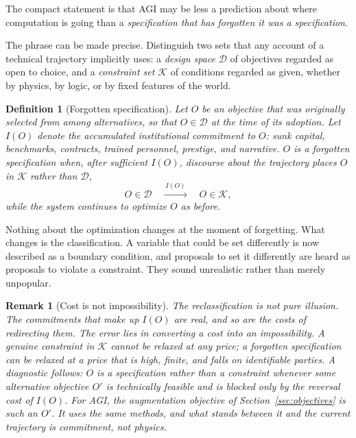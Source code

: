 \documentclass[11pt]{article}
\newtheorem{definition}{Definition}
\newtheorem{remark}{Remark}
\begin{document}
The compact statement is that AGI may be less a prediction about where computation is going than a \emph{specification that has forgotten it was a specification}.

The phrase can be made precise. Distinguish two sets that any account of a technical trajectory implicitly uses: a \emph{design space} $\mathcal{D}$ of objectives regarded as open to choice, and a \emph{constraint set} $\mathcal{K}$ of conditions regarded as given, whether by physics, by logic, or by fixed features of the world.

\begin{definition}[Forgotten specification]
Let $O$ be an objective that was originally selected from among alternatives, so that $O \in \mathcal{D}$ at the time of its adoption. Let $I(O)$ denote the accumulated institutional commitment to $O$: sunk capital, benchmarks, contracts, trained personnel, prestige, and narrative. $O$ is a \emph{forgotten specification} when, after sufficient $I(O)$, discourse about the trajectory places $O$ in $\mathcal{K}$ rather than $\mathcal{D}$,
\[
O \in \mathcal{D}
\quad\xrightarrow{\ I(O)\ }\quad
O \in \mathcal{K},
\]
while the system continues to optimize $O$ as before.
\end{definition}

Nothing about the optimization changes at the moment of forgetting. What changes is the classification. A variable that could be set differently is now described as a boundary condition, and proposals to set it differently are heard as proposals to violate a constraint. They sound unrealistic rather than merely unpopular.

\begin{remark}[Cost is not impossibility]
The reclassification is not pure illusion. The commitments that make up $I(O)$ are real, and so are the costs of redirecting them. The error lies in converting a cost into an impossibility. A genuine constraint in $\mathcal{K}$ cannot be relaxed at any price; a forgotten specification can be relaxed at a price that is high, finite, and falls on identifiable parties. A diagnostic follows: $O$ is a specification rather than a constraint whenever some alternative objective $O'$ is technically feasible and is blocked only by the reversal cost of $I(O)$. For AGI, the augmentation objective of Section~\ref{sec:objectives} is such an $O'$. It uses the same methods, and what stands between it and the current trajectory is commitment, not physics.
\end{remark}
\end{document}
